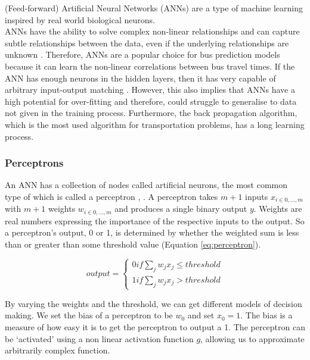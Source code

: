 (Feed-forward) Artificial Neural Networks (ANNs) are a type of machine learning inspired by real world biological neurons. \\

ANNs have the ability to solve complex non-linear relationships and can capture subtle relationships between the data, even if the underlying relationships are unknown \cite{dynamic-gps}. Therefore, ANNs are a popular choice for bus prediction models because it can learn the non-linear correlations between bus travel times. If the ANN has enough neurons in the hidden layers, then it has very capable of arbitrary input-output matching \cite{intelligent-transport-systems}. However, this also implies that ANNs have a high potential for over-fitting and therefore, could struggle to generalise to data not given in the training process. Furthermore, the back propagation algorithm, which is the most used algorithm for transportation problems, has a long learning process. 

\subsubsection{Perceptrons}

An ANN has a collection of nodes called artificial neurons, the most common type of which is called a perceptron \cite{methods-for-ds-slides}, \cite{neural-networks-book}. A perceptron takes $m + 1$ inputs $x_{i\in{0,...,m}}$ with $m + 1$ weights $w_{i\in{0,...,m}}$ and produces a single binary output $y$. Weights are real numbers expressing the importance of the respective inputs to the output. So a perceptron's output, 0 or 1, is determined by whether the weighted sum is less than or greater than some threshold value (Equation \ref{eq:perceptron}).

\begin{equation}
    output = 
    \begin{cases} 
        0 if \sum_jw_jx_j \leqslant threshold \\
        1 if \sum_jw_jx_j > threshold
    \end{cases}
    \label{eq:perceptron}
\end{equation}

By varying the weights and the threshold, we can get different models of decision making. We set the bias of a perceptron to be $w_0$ and set $x_0 = 1$. The bias is a measure of how easy it is to get the perceptron to output a 1. The perceptron can be `activated' using a non linear activation function $g$, allowing us to approximate arbitrarily complex function. \\

